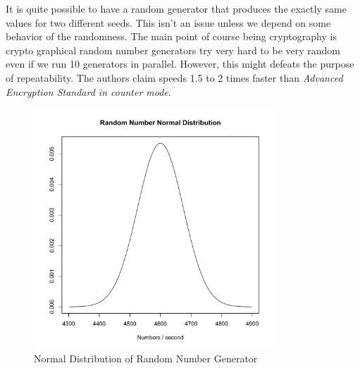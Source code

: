 \documentclass[12pt,journal,compsoc]{IEEEtran}
\begin{document}
 It is quite possible to have a random generator that produces the exactly same values for two different seeds. This isn't an issue unless we depend on some behavior of the randomness. The main point of course being cryptography is crypto graphical random number generators try very hard to be very random even if we run 10 generators in parallel. However, this might defeats the purpose of repeatability. The authors claim speeds 1.5 to 2 times faster than \emph{Advanced Encryption Standard in counter mode}\cite{1347044}.

\begin{figure}[ht!]
\centering
\includegraphics[width=90mm]{images/plotRandomNumber.pdf}
\caption{Normal Distribution of Random Number Generator}
\label{fig:plotRandomNumber}
\end{figure}
 
 
\end{document}
